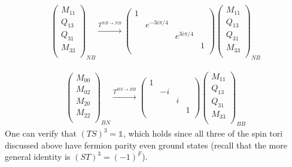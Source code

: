 \documentclass[12pt,a4paper]{article}
\newcounter{arrow}
\newcommand{\unit}{\mathds{1}}
\begin{document}
\begin{align}
\left( \begin{matrix}
M_{11}\\
Q_{13}\\
Q_{31}\\
M_{33}\\
\end{matrix} \right)_{NB}
\xrightarrow{T^{NB \rightarrow NB}}
 \left( \begin{matrix}
 1&&&\\
&e^{-3 i \pi /4}&&\\
&&e^{3 i \pi /4}&\\
&&&1\\
\end{matrix} \right)
\left( \begin{matrix}
M_{11}\\
Q_{13}\\
Q_{31}\\
M_{33}\\
\end{matrix} \right)_{NB}
\end{align}

\begin{align}
\left( \begin{matrix}
M_{00}\\
M_{02}\\
M_{20}\\
M_{22}\\
\end{matrix} \right)_{BN}
\xrightarrow{T^{BN \rightarrow BB}}
\left( \begin{matrix}
1&&&\\
&-i&&\\
&&i&\\
&&&1\\
\end{matrix} \right)
\left( \begin{matrix}
M_{11}\\
Q_{13}\\
Q_{31}\\
M_{33}\\
\end{matrix} \right)_{BB}
\end{align}
One can verify that $(TS)^3 = \unit$, which holds since all three of the spin tori discussed above have 
fermion parity even ground states (recall that the more general identity is $(ST)^3 = (-1)^F$). 
\end{document}
